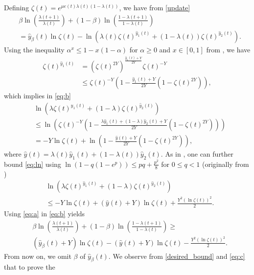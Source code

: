 \documentclass[journal]{IEEEtran}
\newcommand{\nn}{\nonumber}
\begin{document}
Defining $\zeta(t) = e^{\mu e(t)\lambda(t)(1 - \lambda(t))}$, we have from \eqref{update}
\begin{align}
&\beta \ln\left(\frac{\lambda(t+1)}{\lambda(t)}\right)+(1-\beta) \ln\left(\frac{1-\lambda(t+1)}{1-\lambda(t)}\right) \nn\\&= \hat{y}_{\beta}(t) \ln \zeta(t) - \ln(\lambda(t) \zeta(t)^{\hat{y}_1(t)} + (1-\lambda(t))\zeta(t)^{\hat{y}_2(t)}).\label{eq:b}
\end{align}\normalsize
Using the inequality $\alpha^x \leq 1 - x(1-\alpha)$ for $\alpha \geq 0$ and $x \in [0,1]$ from \cite{cesab}, we have
\begin{align*}
\zeta(t)^{\hat{y}_1(t)} & = (\zeta(t)^{2Y})^{\frac{\hat{y}_1(t) + Y}{2Y}} \zeta(t)^{-Y} \\
                   & \leq \zeta(t)^{-Y}\left(1 - \frac{\hat{y}_1(t) + Y}{2Y}(1- \zeta(t)^{2Y})\right), \nonumber
\end{align*}\normalsize
which implies in \eqref{eq:b}
\begin{align}
&\ln\left(\lambda \zeta(t)^{\hat{y}_1(t)} + (1-\lambda) \zeta(t)^{\hat{y}_2(t)}\right) \nn\\
&\leq \ln \left( \zeta(t)^{-Y}(1 - \frac{\lambda \hat{y}_1(t) + (1-\lambda) \hat{y}_2(t) + Y}{2Y}(1- \zeta(t)^{2Y})) \right) \nonumber \\
& = -Y \ln \zeta(t) + \ln \left(1 - \frac{\hat{y}(t)+ Y}{2Y}(1-\zeta(t)^{2Y})\right),\label{eq:ln}
\end{align}\normalsize
where $\hat{y}(t)= \lambda(t) \hat{y}_1(t) + (1-\lambda(t))
\hat{y}_2(t)$. As in \cite{KiWa02}, one can further bound
\eqref{eq:ln} using $\ln(1-q(1-e^p)) \leq pq+\frac{p^2}{8}$ for $0
\leq q<1$ (originally from \cite{cesab})
\begin{align}
&\ln\left(\lambda \zeta(t)^{\hat{y}_1(t)} + (1-\lambda) \zeta(t)^{\hat{y}_2(t)}\right) \nn\\
&\leq  -Y \ln \zeta(t) +  (\hat{y}(t)+ Y) \ln\zeta(t) +\frac{Y^2 (\ln \zeta(t))^2}{2}. \label{eq:a}
\end{align}\normalsize
Using
\eqref{eq:a} in \eqref{eq:b} yields
\begin{align}
&\beta \ln\left(\frac{\lambda(t+1)}{\lambda(t)}\right)+(1-\beta) \ln\left(\frac{1-\lambda(t+1)}{1-\lambda(t)}\right) \geq \label{eq:c}\\ & (\hat{y}_{\beta}(t) + Y)\ln \zeta(t) -  (\hat{y}(t)+ Y) \ln\zeta(t) - \frac{Y^2 (\ln \zeta(t))^2}{2} . \nn
\end{align}\normalsize
From now on, we omit $\beta$ of $\hat{y}_{\beta}(t)$. We observe from \eqref{desired_bound} and \eqref{eq:c} that to prove the
\end{document}
